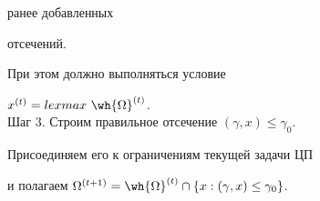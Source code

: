  \hspace{7mm} ранее добавленных


 отсечений.





 \hspace{7mm} При этом должно выполняться условие 





 \hspace{20mm} $x^{(t)} = lexmax \ \wh{ \Omega}^{(t)}$.\\


 Шаг 3. Строим правильное отсечение  $( \gamma,x) \leq \gamma_{0}$.





 \hspace{7mm} Присоединяем его к ограничениям текущей задачи ЦП





 \hspace{7mm} и полагаем $ \Omega^{(t+1)} = \wh{ \Omega}^{(t)} \cap \{x:


 ( \gamma,x) \leq \gamma_{0} \}$.\\


